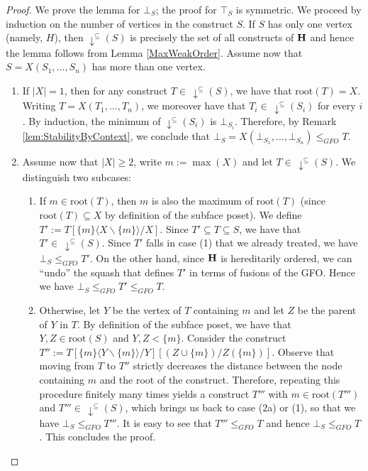\documentclass{article}
\theoremstyle{plain}
\theoremstyle{definition}
\begin{document}
\begin{proof} We prove the lemma for $\bot_S$; the proof for $\top_S$ is symmetric.
We proceed by induction on the number of vertices in the construct $S$. If $S$ has only one vertex (namely, $H$), then $\downarrow^{\subseteq}\!({S})$ is precisely the set of all constructs of ${\bf H}$ and hence the lemma follows from Lemma \ref{MaxWeakOrder}. Assume now that $S=X(S_1,\dots,S_n)$ has more than one vertex. 
\begin{enumerate}
\item If $|X|=1$, then for any construct $T\in \,\downarrow^{\subseteq}\!({S})$, we have that $\text{root}(T)=X$. Writing $T=X(T_1,\dots,T_n)$, we moreover have that $T_i\in\, \downarrow^{\subseteq}\!(S_i)$ for every $i$. By induction, the minimum of $\downarrow^{\subseteq}(S_i)$ is $\bot_{S_i}$. Therefore, by Remark \ref{lem:StabilityByContext}, we conclude that $\bot_S=X(\bot_{S_1},\dots,\bot_{S_n})\leq_{\mathit{GFO}} T$.
\item Assume now that $|X|\geq 2$, write $m:=\max(X)$ and let $T\in\,\downarrow^{\subseteq}\!(S)$. 
We distinguish two subcases:
\begin{enumerate}
\item If $m\in \text{root}(T)$, then $m$ is also the maximum of $\text{root}(T)$ (since $\text{root}(T)\subseteq X$ by definition of the subface poset). We define $T':=T[\{m\}\langle X\backslash\{m\}\rangle/X]$. Since $T'\subseteq T\subseteq S$, we have that $T'\in \,\downarrow^{\subseteq}\!(S)$. 
Since $T'$ falls in case (1) that we already treated, we have $\bot_S \leq_{\mathit{GFO}} T'$.
On the other hand, since ${\bf H}$ is hereditarily ordered, we can ``undo'' the squash that defines $T'$ in terms of fusions of the GFO. Hence we have $\bot_S \leq_{\mathit{GFO}} T'\leq_{\mathit{GFO}} T$. 
\item Otherwise, let $Y$ be the vertex of $T$ containing $m$ and let $Z$ be the parent of $Y$ in $T$. By definition of the subface poset, we have that $Y,Z\in \text{root}(S)$ and $Y,Z<\{m\}$. Consider the construct $T'':=T[\{m\}\langle Y\backslash\{m\} \rangle/Y][(Z\cup\{m\})/Z(\{m\})]$. Observe that moving from $T$ to $T''$ strictly decreases the distance between the node containing $m$ and the root of the construct. Therefore, repeating this procedure finitely many times yields a construct $T'''$ with $m\in \text{root}(T''')$ and $T'''\in \,\downarrow^{\subseteq}\!(S)$, which brings us back to case (2a) or (1), so that we have $\bot_S\leq_{\mathit{GFO}} T'''$. It is easy to see that $T'''\leq_{\mathit{GFO}} T$ and hence
$\bot_S\leq_{\mathit{GFO}} T$. This concludes the proof.
\end{enumerate}
\end{enumerate}
\end{proof}
\end{document}
